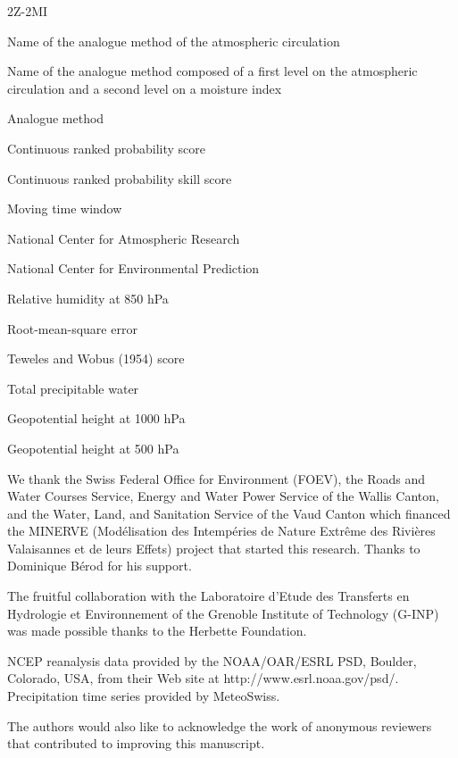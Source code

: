 \documentclass[hess, manuscript]{copernicus}
\begin{document}
	\begin{labeling}{2Z-2MI}
		\item [2Z] Name of the analogue method of the atmospheric circulation
		\item [2Z-2MI] Name of the analogue method composed of a first level on the atmospheric circulation and a second level on a moisture index
		\item [AM] Analogue method
		\item [CRPS] Continuous ranked probability score
		\item [CRPSS] Continuous ranked probability skill score
		\item [MTW] Moving time window
		\item [NCAR] National Center for Atmospheric Research
		\item [NCEP] National Center for Environmental Prediction
		\item [RH850] Relative humidity at 850 hPa
		\item [RMSE] Root-mean-square error
		\item [S1] Teweles and Wobus (1954) score
		\item [TPW] Total precipitable water
		\item [Z1000] Geopotential height at 1000 hPa
		\item [Z500] Geopotential height at 500 hPa
	\end{labeling}
	
		
	
	
	
	\begin{acknowledgements}
		We thank the Swiss Federal Office for Environment (FOEV), the Roads and Water Courses Service, Energy and Water Power Service of the Wallis Canton, and the Water, Land, and Sanitation Service of the Vaud Canton which financed the MINERVE (Mod\'{e}lisation des Intemp\'{e}ries de Nature Extr\^{e}me des Rivi\`{e}res Valaisannes et de leurs Effets) project that started this research. Thanks to Dominique B\'{e}rod for his support.
		
		The fruitful collaboration with the Laboratoire d'Etude des Transferts en Hydrologie et Environnement of the Grenoble Institute of Technology (G-INP) was made possible thanks to the Herbette Foundation. 
		
		NCEP reanalysis data provided by the NOAA/OAR/ESRL PSD, Boulder, Colorado, USA, from their Web site at http://www.esrl.noaa.gov/psd/. Precipitation time series provided by MeteoSwiss.
		
		The authors would also like to acknowledge the work of anonymous reviewers that contributed to improving this manuscript. 
	\end{acknowledgements}
	
\end{document}
